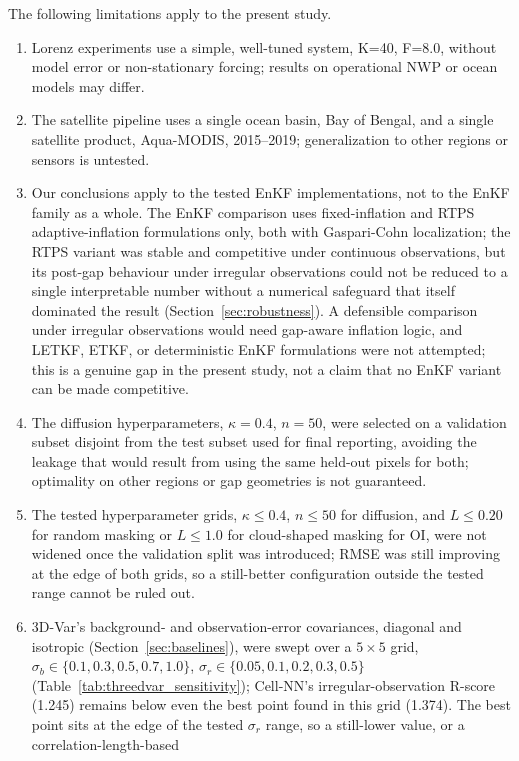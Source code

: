 \documentclass[final,5p,times,twocolumn,authoryear]{elsarticle}
\begin{document}
The following limitations apply to the present study.
\begin{enumerate}
\item Lorenz experiments use a simple, well-tuned system, K=40,
F=8.0, without model error or non-stationary forcing; results on
operational NWP or ocean models may differ.
\item The satellite pipeline uses a single ocean basin, Bay of
Bengal, and a single satellite product, Aqua-MODIS, 2015--2019;
generalization to other regions or sensors is untested.
\item Our conclusions apply to the tested EnKF implementations, not
to the EnKF family as a whole. The EnKF comparison uses fixed-inflation
and RTPS adaptive-inflation formulations only, both with Gaspari-Cohn
localization; the RTPS variant was stable and competitive under
continuous observations, but its post-gap behaviour under irregular
observations could not be reduced to a single interpretable number
without a numerical safeguard that itself dominated the result
(Section~\ref{sec:robustness}). A defensible comparison under
irregular observations would need gap-aware inflation logic, and
LETKF, ETKF, or deterministic EnKF formulations were not attempted;
this is a genuine gap in the present study, not a claim that no
EnKF variant can be made competitive.
\item The diffusion hyperparameters, $\kappa=0.4$, $n=50$, were
selected on a validation subset disjoint from the test subset used
for final reporting, avoiding the leakage that would result from
using the same held-out pixels for both; optimality on other regions
or gap geometries is not guaranteed.
\item The tested hyperparameter grids, $\kappa \leq 0.4$, $n \leq 50$
for diffusion, and $L \leq 0.20$ for random masking or $L \leq 1.0$
for cloud-shaped masking for OI, were not widened once the validation
split was introduced; RMSE was still improving at the edge of both
grids, so a still-better configuration outside the tested range
cannot be ruled out.
\item 3D-Var's background- and observation-error covariances,
diagonal and isotropic (Section~\ref{sec:baselines}), were swept over
a $5\times5$ grid, $\sigma_b \in \{0.1,0.3,0.5,0.7,1.0\}$,
$\sigma_r \in \{0.05,0.1,0.2,0.3,0.5\}$
(Table~\ref{tab:threedvar_sensitivity}); Cell-NN's irregular-observation
R-score (1.245) remains below even the best point found in this grid
(1.374). The best point sits at the edge of the tested $\sigma_r$
range, so a still-lower value, or a correlation-length-based

\end{enumerate}
\end{document}
